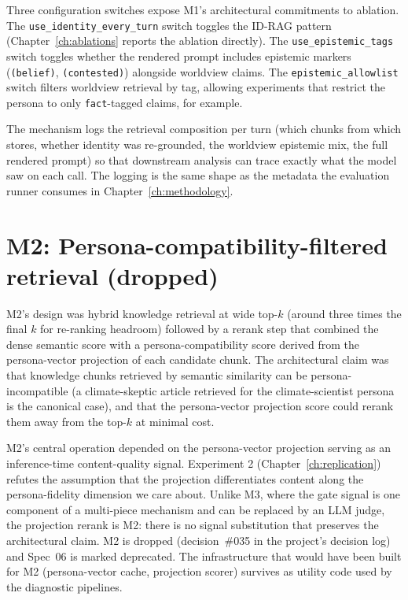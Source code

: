 Three configuration switches expose M1's architectural commitments to ablation. The \texttt{use\_identity\_every\_turn} switch toggles the ID-RAG pattern (Chapter~\ref{ch:ablations} reports the ablation directly). The \texttt{use\_epistemic\_tags} switch toggles whether the rendered prompt includes epistemic markers (\texttt{(belief)}, \texttt{(contested)}) alongside worldview claims. The \texttt{epistemic\_allowlist} switch filters worldview retrieval by tag, allowing experiments that restrict the persona to only \texttt{fact}-tagged claims, for example.

The mechanism logs the retrieval composition per turn (which chunks from which stores, whether identity was re-grounded, the worldview epistemic mix, the full rendered prompt) so that downstream analysis can trace exactly what the model saw on each call. The logging is the same shape as the metadata the evaluation runner consumes in Chapter~\ref{ch:methodology}.

\section{M2: Persona-compatibility-filtered retrieval (dropped)}

M2's design was hybrid knowledge retrieval at wide top-$k$ (around three times the final $k$ for re-ranking headroom) followed by a rerank step that combined the dense semantic score with a persona-compatibility score derived from the persona-vector projection of each candidate chunk. The architectural claim was that knowledge chunks retrieved by semantic similarity can be persona-incompatible (a climate-skeptic article retrieved for the climate-scientist persona is the canonical case), and that the persona-vector projection score could rerank them away from the top-$k$ at minimal cost.

M2's central operation depended on the persona-vector projection serving as an inference-time content-quality signal. Experiment 2 (Chapter~\ref{ch:replication}) refutes the assumption that the projection differentiates content along the persona-fidelity dimension we care about. Unlike M3, where the gate signal is one component of a multi-piece mechanism and can be replaced by an LLM judge, the projection rerank is M2: there is no signal substitution that preserves the architectural claim. M2 is dropped (decision~\#035 in the project's decision log) and Spec~06 is marked deprecated. The infrastructure that would have been built for M2 (persona-vector cache, projection scorer) survives as utility code used by the diagnostic pipelines.

